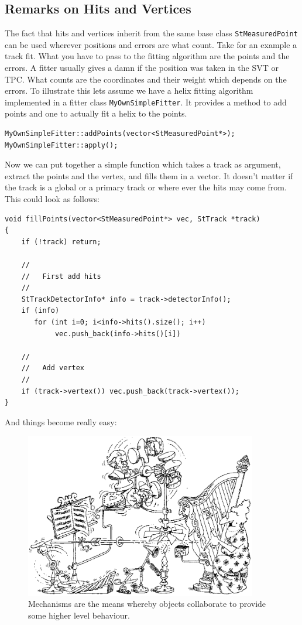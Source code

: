 \documentclass[twoside]{article}
\begin{document}
\subsection{Remarks on Hits and Vertices}
The fact that hits and vertices inherit from the same base class
\texttt{StMeasuredPoint} can be used wherever positions and errors
are what count. Take for an example a track fit. What you have to pass
to the fitting algorithm are the points and the errors. A fitter usually
gives a damn if the position was taken in the SVT or TPC. What counts
are the coordinates and their weight which depends on the errors.
To illustrate this lets assume we have a helix fitting
algorithm implemented in a fitter class \texttt{MyOwnSimpleFitter}.
It provides a method to add points and one to actually fit a helix to
the points.
\begin{verbatim}
MyOwnSimpleFitter::addPoints(vector<StMeasuredPoint*>);
MyOwnSimpleFitter::apply();
\end{verbatim}
Now we can put together a simple function which takes a track
as argument, extract the points and the vertex, and fills them in a vector.
It doesn't matter if the track is a global or a primary track or where ever
the hits may come from. This could look as follows:
\begin{verbatim}
void fillPoints(vector<StMeasuredPoint*> vec, StTrack *track)
{
    if (!track) return;

    //
    //   First add hits
    //
    StTrackDetectorInfo* info = track->detectorInfo();
    if (info) 
       for (int i=0; i<info->hits().size(); i++)
            vec.push_back(info->hits()[i])

    //
    //   Add vertex
    //
    if (track->vertex()) vec.push_back(track->vertex());
}
\end{verbatim}
And things become really easy:
\begin{figure}[tb]
    \begin{center}
        \includegraphics[width=0.9\textwidth]{cartoon7.eps}
        \caption{Mechanisms are the means whereby objects collaborate
            to provide some higher level behaviour.}
    \end{center}
\end{figure}
\end{document}
